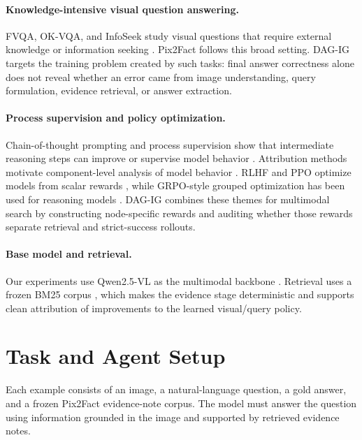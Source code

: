 \paragraph{Knowledge-intensive visual question answering.}
FVQA, OK-VQA, and InfoSeek study visual questions that require external knowledge or information seeking \cite{wang2017fvqa,marino2019okvqa,chen2023infoseek}. Pix2Fact follows this broad setting. DAG-IG targets the training problem created by such tasks: final answer correctness alone does not reveal whether an error came from image understanding, query formulation, evidence retrieval, or answer extraction.

\paragraph{Process supervision and policy optimization.}
Chain-of-thought prompting and process supervision show that intermediate reasoning steps can improve or supervise model behavior \cite{wei2022cot,lightman2023process}. Attribution methods motivate component-level analysis of model behavior \cite{sundararajan2017integrated}. RLHF and PPO optimize models from scalar rewards \cite{ouyang2022instructgpt,schulman2017ppo}, while GRPO-style grouped optimization has been used for reasoning models \cite{shao2024deepseekmath}. DAG-IG combines these themes for multimodal search by constructing node-specific rewards and auditing whether those rewards separate retrieval and strict-success rollouts.

\paragraph{Base model and retrieval.}
Our experiments use Qwen2.5-VL as the multimodal backbone \cite{qwen2025qwen25vl}. Retrieval uses a frozen BM25 corpus \cite{robertson1994okapi}, which makes the evidence stage deterministic and supports clean attribution of improvements to the learned visual/query policy.

\section{Task and Agent Setup}

Each example consists of an image, a natural-language question, a gold answer, and a frozen Pix2Fact evidence-note corpus. The model must answer the question using information grounded in the image and supported by retrieved evidence notes.

